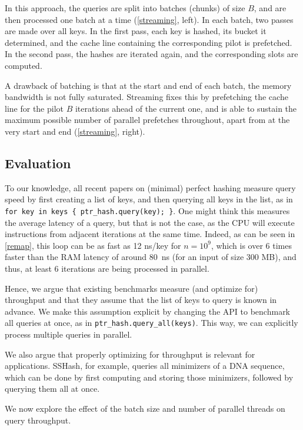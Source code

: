 \documentclass[a4paper,UKenglish,cleveref,thm-restate]{lipics-v2021}
\begin{document}
In this approach, the queries are split into batches (chunks) of size
\(B\), and are then processed one batch at a time (\cref{streaming}, left).
In each batch, two passes are made over all keys.
In the first pass, each key is hashed, its
bucket it determined, and the cache line containing the corresponding pilot is prefetched.
In the second pass, the hashes are iterated again, and the corresponding slots are
computed.

A drawback of batching is that at the start and end of each batch, the
memory bandwidth is not fully saturated.
Streaming fixes this by prefetching the cache line for the pilot \(B\) iterations
ahead of the current one, and is able to sustain the maximum possible number of
parallel prefetches throughout, apart from at the very start and end (\cref{streaming}, right).
\subsection{Evaluation}
\label{query-eval}
To our knowledge, all recent papers on (minimal) perfect hashing measure query
speed by first creating a list of keys, and then querying all keys in the list,
as in \texttt{for key in keys \{ ptr\_hash.query(key); \}}. One might think this measures the average
latency of a query, but that is not the case, as the CPU will execute
instructions from adjacent iterations at the same time.
Indeed, as can be seen in \cref{remap}, this loop can be as fast as 12
ns/key for \(n=10^9\), which is over 6 times faster than the RAM latency of
around 80~ns (for an input of size 300 MB),
and thus, at least 6 iterations are being processed in parallel.

Hence, we argue that existing benchmarks measure (and optimize for)
throughput and that they assume that the list of keys to query is known in advance.
We make this assumption explicit by changing the API to benchmark all queries at
once, as in \texttt{ptr\_hash.query\_all(keys)}. This way, we can explicitly process
multiple queries in parallel.

We also argue that properly optimizing for throughput is relevant for
applications. SSHash, for example, queries all minimizers of a DNA sequence,
which can be done by first computing and storing those minimizers, followed by
querying them all at once.

We now explore the effect of the batch size and number of parallel threads on
query throughput.
\end{document}
